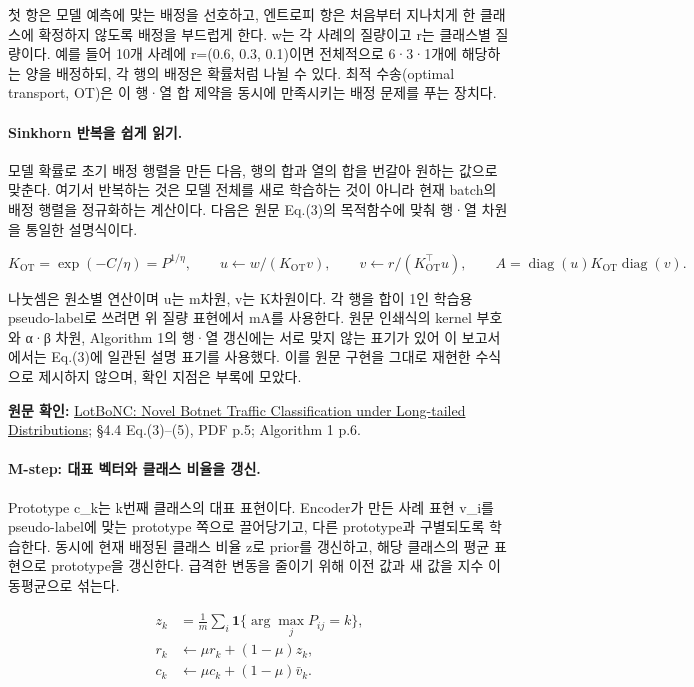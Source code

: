 첫 항은 모델 예측에 맞는 배정을 선호하고, 엔트로피 항은 처음부터 지나치게 한 클래스에 확정하지 않도록 배정을 부드럽게 한다. w는 각 사례의 질량이고 r는 클래스별 질량이다. 예를 들어 10개 사례에 r=\allowbreak{}(0.6, 0.3, 0.1)이면 전체적으로 6·3·1개에 해당하는 양을 배정하되, 각 행의 배정은 확률처럼 나뉠 수 있다. 최적 수송(optimal transport, OT)은 이 행·열 합 제약을 동시에 만족시키는 배정 문제를 푸는 장치다.


\paragraph{Sinkhorn 반복을 쉽게 읽기.} 모델 확률로 초기 배정 행렬을 만든 다음, 행의 합과 열의 합을 번갈아 원하는 값으로 맞춘다. 여기서 반복하는 것은 모델 전체를 새로 학습하는 것이 아니라 현재 batch의 배정 행렬을 정규화하는 계산이다. 다음은 원문 Eq.(3)의 목적함수에 맞춰 행·열 차원을 통일한 설명식이다.


\[
      K_{\mathrm{OT}}=\exp(-C/\eta)=P^{1/\eta},\qquad
      u\leftarrow w/(K_{\mathrm{OT}}v),\qquad
      v\leftarrow r/(K_{\mathrm{OT}}^\top u),\qquad
      A=\operatorname{diag}(u)K_{\mathrm{OT}}\operatorname{diag}(v).
    \]

나눗셈은 원소별 연산이며 u는 m차원, v는 K차원이다. 각 행을 합이 1인 학습용 pseudo-label로 쓰려면 위 질량 표현에서 mA를 사용한다. 원문 인쇄식의 kernel 부호와 α·β 차원, Algorithm 1의 행·열 갱신에는 서로 맞지 않는 표기가 있어 이 보고서에서는 Eq.(3)에 일관된 설명 표기를 사용했다. 이를 원문 구현을 그대로 재현한 수식으로 제시하지 않으며, 확인 지점은 부록에 모았다.


{\small\textbf{원문 확인:} \href{https://doi.org/10.1145/3779208.3785276}{LotBoNC: Novel Botnet Traffic Classification under Long-tailed Distributions}; §4.4 Eq.(3)–(5), PDF p.5; Algorithm 1 p.6.}\par

\paragraph{M-step: 대표 벡터와 클래스 비율을 갱신.} Prototype c\_\allowbreak{}k는 k번째 클래스의 대표 표현이다. Encoder가 만든 사례 표현 v\_\allowbreak{}i를 pseudo-label에 맞는 prototype 쪽으로 끌어당기고, 다른 prototype과 구별되도록 학습한다. 동시에 현재 배정된 클래스 비율 z로 prior를 갱신하고, 해당 클래스의 평균 표현으로 prototype을 갱신한다. 급격한 변동을 줄이기 위해 이전 값과 새 값을 지수 이동평균으로 섞는다.


\begin{align}
       z_k&=\frac1m\sum_i \mathbf1\{\arg\max_j P_{ij}=k\},\\
       r_k&\leftarrow \mu r_k+(1-\mu)z_k,\\
       c_k&\leftarrow \mu c_k+(1-\mu)\bar v_k .
    \end{align}

